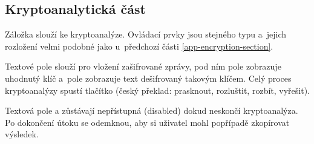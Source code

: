 \documentclass[glossaries, index]{kidiplom}
\begin{document}
\subsection{Kryptoanalytická část}
\label{app-cracking-section}
Záložka  slouží ke kryptoanalýze. Ovládací prvky jsou stejného typu a~jejich rozložení velmi podobné jako u~předchozí části \ref{app-encryption-section}. 

Textové pole  slouží pro vložení zašifrované zprávy, pod ním pole  zobrazuje uhodnutý klíč a~pole  zobrazuje text dešifrovaný takovým klíčem. Celý proces kryptoanalýzy spustí tlačítko  (český překlad: prasknout, rozluštit, rozbít, vyřešit).

Textová pole  a  zůstávají nepřístupná (disabled) dokud neskončí kryptoanalýza. Po dokončení útoku se odemknou, aby si uživatel mohl popřípadě zkopírovat výsledek.
\end{document}
